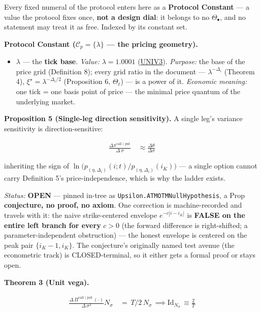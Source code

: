 \documentclass[11pt]{article}
\providecommand{\tightlist}{\setlength{\itemsep}{0pt}\setlength{\parskip}{0pt}}
\renewcommand{\_}{\textunderscore\allowbreak}
\begin{document}
Every fixed numeral of the protocol enters here as a \textbf{Protocol Constant} --- a value the protocol fixes once, \textbf{not a design dial}: it belongs to no \(\Theta_{\bullet}\), and no statement may treat it as free. Indexed by its constant set.

\textbf{Protocol Constant (\(\mathcal{C}_{p} = \{\lambda\}\) --- the pricing geometry).}

\begin{itemize}
\tightlist
\item
  \(\lambda\) --- the \textbf{tick base}. \emph{Value:} \(\lambda = 1.0001\) (\href{../refs/uniswap-v3-core.pdf}{UNI\_V3}). \emph{Purpose:} the base of the price grid (Definition 8); every grid ratio in the document --- \(\lambda^{-\Delta_i}\) (Theorem 4), \(\xi^{\star} = \lambda^{-\Delta_i/2}\) (Proposition 6, \(\Theta_{\ell}\)) --- is a power of it. \emph{Economic meaning:} one tick = one basis point of price --- the minimal price quantum of the underlying market.
\end{itemize}

\textbf{Proposition 5 (Single-leg direction sensitivity).} A single leg's variance sensitivity is direction-sensitive:

\[
    \begin{aligned}
        \frac{\Delta \pi^{\text{call | put}}}{\Delta \, \sigma} \, &\approx \frac{\Delta \theta}{\Delta \sigma}
    \end{aligned}
\]

inheriting the sign of \(\ln \big(p_{(\eta, \Delta_i)}(i;t) / p_{(\eta, \Delta_i)}(i_K)\big)\) --- a single option cannot carry Definition 5's price-independence, which is why the ladder exists.

\emph{Status:} \textbf{OPEN} --- pinned in-tree as \texttt{Upsilon.ATMOTMNullHypothesis}, a Prop \textbf{conjecture, no proof, no axiom}. One correction is machine-recorded and travels with it: the naive strike-centered envelope \(e^{-c|i-i_K|}\) is \textbf{FALSE on the entire left branch for every} \(c > 0\) (the forward difference is right-shifted; a parameter-independent obstruction) --- the honest envelope is centered on the peak pair \(\{i_K{-}1, i_K\}\). The conjecture's originally named test avenue (the econometric track) is CLOSED-terminal, so it either gets a formal proof or stays open.

\textbf{Theorem 3 (Unit vega).}

\[
    \begin{aligned}
        \frac{\Delta \, \Pi^{\text{call | put}} \, ( \cdot )}{\Delta \, \sigma^{2} } N_{\sigma} \, &= \, T/2 \, N_{\sigma} \, \implies \text{Id}_{ N_{\sigma}} \, \equiv \frac{2}{T}
    \end{aligned}
\]
\end{document}
